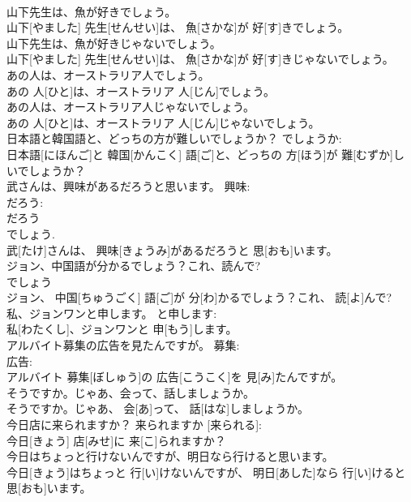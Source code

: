 \documentclass[8pt]{extreport}
\begin{document}
\begin{CJK}{UTF8}{min}
\\	山下先生は、魚が好きでしょう。	
\\	山下[やました] 先生[せんせい]は、 魚[さかな]が 好[す]きでしょう。	
\\	山下先生は、魚が好きじゃないでしょう。	
\\	山下[やました] 先生[せんせい]は、 魚[さかな]が 好[す]きじゃないでしょう。	
\\	あの人は、オーストラリア人でしょう。	
\\	あの 人[ひと]は、オーストラリア 人[じん]でしょう。	
\\	あの人は、オーストラリア人じゃないでしょう。	
\\	あの 人[ひと]は、オーストラリア 人[じん]じゃないでしょう。	
\\	日本語と韓国語と、どっちの方が難しいでしょうか？	でしょうか: 
\\	日本語[にほんご]と 韓国[かんこく] 語[ご]と、どっちの 方[ほう]が 難[むずか]しいでしょうか？	
\\	武さんは、興味があるだろうと思います。	興味: 
\\	だろう: 
\\	だろう 
\\	でしょう. 
\\	武[たけ]さんは、 興味[きょうみ]があるだろうと 思[おも]います。	
\\	ジョン、中国語が分かるでしょう？これ、読んで?	
\\	でしょう 
\\	ジョン、 中国[ちゅうごく] 語[ご]が 分[わ]かるでしょう？これ、 読[よ]んで?	
\\	私、ジョンワンと申します。	と申します: 
\\	私[わたくし]、ジョンワンと 申[もう]します。	
\\	アルバイト募集の広告を見たんですが。	募集: 
\\	広告: 
\\	アルバイト 募集[ぼしゅう]の 広告[こうこく]を 見[み]たんですが。	
\\	そうですか。じゃあ、会って、話しましょうか。	
\\	そうですか。じゃあ、 会[あ]って、 話[はな]しましょうか。	
\\	今日店に来られますか？	来られますか [来られる]: 
\\	今日[きょう] 店[みせ]に 来[こ]られますか？	
\\	今日はちょっと行けないんですが、明日なら行けると思います。	
\\	今日[きょう]はちょっと 行[い]けないんですが、 明日[あした]なら 行[い]けると 思[おも]います。	

\end{CJK}
\end{document}
